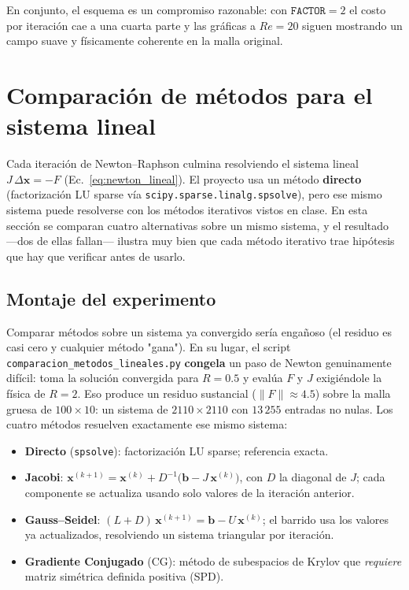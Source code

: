 \documentclass[12pt, a4paper]{article}
\begin{document}
En conjunto, el esquema es un compromiso razonable: con $\texttt{FACTOR}=2$
el costo por iteración cae a una cuarta parte y las gráficas a $Re = 20$
siguen mostrando un campo suave y físicamente coherente en la malla
original.

\section{Comparación de métodos para el sistema lineal}
\label{sec:metodos-lineales}

Cada iteración de Newton--Raphson culmina resolviendo el sistema lineal
$J\,\Delta\mathbf{x} = -F$ (Ec.~\eqref{eq:newton_lineal}). El proyecto usa
un método \textbf{directo} (factorización LU sparse vía
\texttt{scipy.sparse.linalg.spsolve}), pero ese mismo sistema puede
resolverse con los métodos iterativos vistos en clase. En esta sección se
comparan cuatro alternativas sobre un mismo sistema, y el resultado —dos de
ellas fallan— ilustra muy bien que cada método iterativo trae hipótesis
que hay que verificar antes de usarlo.

\subsection{Montaje del experimento}

Comparar métodos sobre un sistema ya convergido sería engañoso (el residuo
es casi cero y cualquier método "gana"). En su lugar, el script
\texttt{comparacion\_metodos\_lineales.py} \textbf{congela} un paso de
Newton genuinamente difícil: toma la solución convergida para $R = 0.5$ y
evalúa $F$ y $J$ exigiéndole la física de $R = 2$. Eso produce un residuo
sustancial ($\|F\| \approx 4.5$) sobre la malla gruesa de $100\times10$:
un sistema de $2110 \times 2110$ con $13\,255$ entradas no nulas. Los
cuatro métodos resuelven exactamente ese mismo sistema:

\begin{itemize}
  \item \textbf{Directo} (\texttt{spsolve}): factorización LU sparse;
        referencia exacta.
  \item \textbf{Jacobi}: $\mathbf{x}^{(k+1)} = \mathbf{x}^{(k)} +
        D^{-1}\bigl(\mathbf{b} - J\,\mathbf{x}^{(k)}\bigr)$, con $D$ la
        diagonal de $J$; cada componente se actualiza usando solo valores
        de la iteración anterior.
  \item \textbf{Gauss--Seidel}: $(L+D)\,\mathbf{x}^{(k+1)} = \mathbf{b} -
        U\,\mathbf{x}^{(k)}$; el barrido usa los valores ya actualizados,
        resolviendo un sistema triangular por iteración.
  \item \textbf{Gradiente Conjugado} (CG): método de subespacios de Krylov
        que \emph{requiere} matriz simétrica definida positiva (SPD).
\end{itemize}
\end{document}
